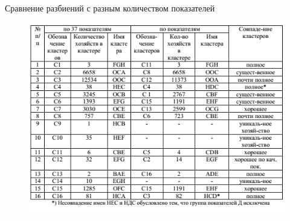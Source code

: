 \documentclass{beamer}
\begin{document}
\begin{frame}
Сравнение разбиений с разным количеством показателей
\begin{figure}[h]
\centering
\includegraphics[scale=0.75]{images/lec07-pic46.png}
\end{figure}
\end{frame}
\end{document}
